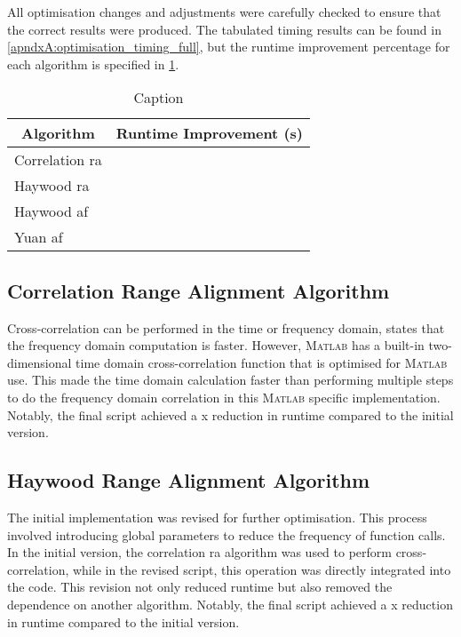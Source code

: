 \documentclass[class=report,11pt,crop=false]{standalone}
\begin{document}
All optimisation changes and adjustments were carefully checked to ensure that the correct results were produced. The tabulated timing results can be found in \autoref{apndxA:optimisation_timing_full}, but the runtime improvement percentage for each algorithm is specified in \ref{tab:optimisation_timing}.

\begin{table}
    \centering
    \begin{tabular}{|l|c|}
        \hline
        \multicolumn{1}{|c|}{\textbf{Algorithm}} & \textbf{Runtime Improvement (s)} \\
        \hline
        Correlation \gls{ra}    & \\
        \hline
        Haywood \gls{ra}               & \\
        \hline
        Haywood \gls{af}               & \\
        \hline
        Yuan \gls{af}                  & \\
        \hline
    \end{tabular}
    \caption{Caption \label{tab:optimisation_timing}}
\end{table}



    \subsection{Correlation Range Alignment Algorithm}
    Cross-correlation can be performed in the time or frequency domain, \cite{ISARtextbook_Martorella} states that the frequency domain computation is faster. However, \textsc{Matlab} has a built-in two-dimensional time domain cross-correlation function that is optimised for \textsc{Matlab} use. This made the time domain calculation faster than performing multiple steps to do the frequency domain correlation in this \textsc{Matlab} specific implementation. Notably, the final script achieved a x reduction in runtime compared to the initial version.
    
    \subsection{Haywood Range Alignment Algorithm}
    The initial implementation was revised for further optimisation. This process involved introducing global parameters to reduce the frequency of function calls.  In the initial version, the correlation \gls{ra} algorithm was used to perform cross-correlation, while in the revised script, this operation was directly integrated into the code. This revision not only reduced runtime but also removed the dependence on another algorithm. Notably, the final script achieved a x reduction in runtime compared to the initial version.
    
\end{document}
